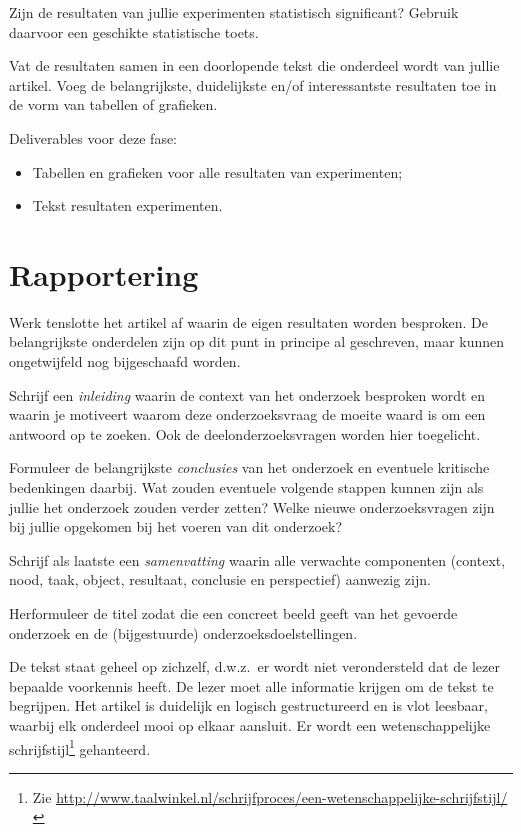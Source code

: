 \documentclass[fleqn,10pt]{voorstel}
\begin{document}
Zijn de resultaten van jullie experimenten statistisch significant? Gebruik daarvoor een geschikte statistische toets.

Vat de resultaten samen in een doorlopende tekst die onderdeel wordt van jullie artikel. Voeg de belangrijkste, duidelijkste en/of interessantste resultaten toe in de vorm van tabellen of grafieken.

Deliverables voor deze fase:

\begin{itemize}
	\item Tabellen en grafieken voor alle resultaten van experimenten;
	\item Tekst resultaten experimenten.
\end{itemize}

\section{Rapportering}

Werk tenslotte het artikel af waarin de eigen resultaten worden besproken. De belangrijkste onderdelen zijn op dit punt in principe al geschreven, maar kunnen ongetwijfeld nog bijgeschaafd worden.

Schrijf een \emph{inleiding} waarin de context van het onderzoek besproken wordt en waarin je motiveert waarom deze onderzoeksvraag de moeite waard is om een antwoord op te zoeken. Ook de deelonderzoeksvragen worden hier toegelicht.

Formuleer de belangrijkste \emph{conclusies} van het onderzoek en eventuele kritische bedenkingen daarbij. Wat zouden eventuele volgende stappen kunnen zijn als jullie het onderzoek zouden verder zetten? Welke nieuwe onderzoeksvragen zijn bij jullie opgekomen bij het voeren van dit onderzoek?

Schrijf als laatste een \emph{samenvatting} waarin alle verwachte componenten (context, nood, taak, object, resultaat, conclusie en perspectief) aanwezig zijn.

Herformuleer de titel zodat die een concreet beeld geeft van het gevoerde onderzoek en de (bijgestuurde) onderzoeksdoelstellingen.

De tekst staat geheel op zichzelf, d.w.z.~er wordt niet verondersteld dat de lezer bepaalde voorkennis heeft. De lezer moet alle informatie krijgen om de tekst te begrijpen. Het artikel is duidelijk en logisch gestructureerd en is vlot leesbaar, waarbij elk onderdeel mooi op elkaar aansluit. Er wordt een wetenschappelijke schrijfstijl\footnote{Zie \url{http://www.taalwinkel.nl/schrijfproces/een-wetenschappelijke-schrijfstijl/}} gehanteerd. 
\end{document}
